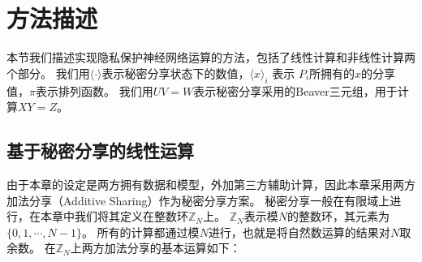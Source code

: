 \section{方法描述}
本节我们描述实现隐私保护神经网络运算的方法，包括了线性计算和非线性计算两个部分。
%
我们用$\langle \cdot \rangle$表示秘密分享状态下的数值，$\langle x \rangle_i$ 表示 $P_i$所拥有的$x$的分享值，$\pi$表示排列函数。
%
我们用$UV = W$表示秘密分享采用的Beaver三元组，用于计算$XY = Z$。
%

\subsection{基于秘密分享的线性运算}
由于本章的设定是两方拥有数据和模型，外加第三方辅助计算，因此本章采用两方加法分享（Additive Sharing）作为秘密分享方案。
%
秘密分享一般在有限域上进行，在本章中我们将其定义在整数环$\mathbb Z_N$上。
%
$\mathbb Z_N$表示模$N$的整数环，其元素为$\{0, 1, \cdots, N - 1\}$。
所有的计算都通过模$N$进行，也就是将自然数运算的结果对$N$取余数。
%
在$\mathbb  Z_N$上两方加法分享的基本运算如下：

